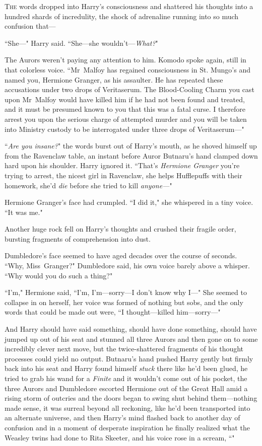 
\lettrine{T}{he} words dropped into Harry's consciousness and shattered his thoughts into a hundred shards of incredulity, the shock of adrenaline running into so much confusion that—

``She—" Harry said. ``She—she wouldn't—\emph{What?}"

The Aurors weren't paying any attention to him. Komodo spoke again, still in that colorless voice. ``Mr~Malfoy has regained consciousness in St. Mungo's and named you, Hermione Granger, as his assaulter. He has repeated these accusations under two drops of Veritaserum. The Blood-Cooling Charm you cast upon Mr~Malfoy would have killed him if he had not been found and treated, and it must be presumed known to you that this was a fatal curse. I therefore arrest you upon the serious charge of attempted murder and you will be taken into Ministry custody to be interrogated under three drops of Veritaserum—"

``\emph{Are you insane?}" the words burst out of Harry's mouth, as he shoved himself up from the Ravenclaw table, an instant before Auror Butnaru's hand clamped down hard upon his shoulder. Harry ignored it. ``That's \emph{Hermione Granger} you're trying to arrest, the nicest girl in Ravenclaw, she helps Hufflepuffs with their homework, she'd \emph{die} before she tried to kill \emph{anyone—}"

Hermione Granger's face had crumpled. ``I did it," she whispered in a tiny voice. ``It was me."

Another huge rock fell on Harry's thoughts and crushed their fragile order, bursting fragments of comprehension into dust.

Dumbledore's face seemed to have aged decades over the course of seconds. ``Why, Miss~Granger?" Dumbledore said, his own voice barely above a whisper. ``Why would you do such a thing?"

``I'm," Hermione said, ``I'm, I'm—sorry—I don't know why I—" She seemed to collapse in on herself, her voice was formed of nothing but sobs, and the only words that could be made out were, ``I thought—killed him—sorry—"

And Harry should have said something, should have done something, should have jumped up out of his seat and stunned all three Aurors and then gone on to some incredibly clever next move, but the twice-shattered fragments of his thought processes could yield no output. Butnaru's hand pushed Harry gently but firmly back into his seat and Harry found himself \emph{stuck} there like he'd been glued, he tried to grab his wand for a \emph{Finite} and it wouldn't come out of his pocket, the three Aurors and Dumbledore escorted Hermione out of the Great Hall amid a rising storm of outcries and the doors began to swing shut behind them—nothing made sense, it was surreal beyond all reckoning, like he'd been transported into an alternate universe, and then Harry's mind flashed back to another day of confusion and in a moment of desperate inspiration he finally realized what the Weasley twins had done to Rita Skeeter, and his voice rose in a scream, ``"

